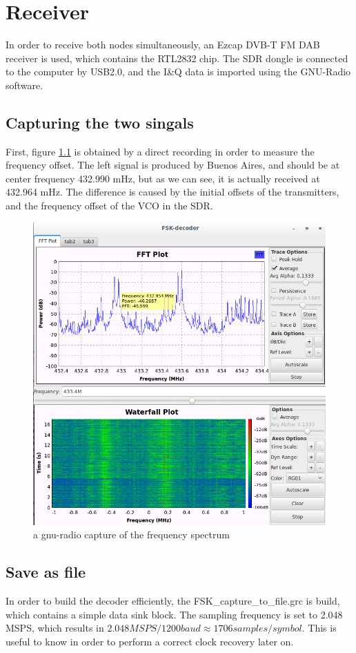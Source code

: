\chapter{Receiver}

In order to receive both nodes simultaneously, an Ezcap DVB-T FM DAB receiver is used, which contains the RTL2832 chip. The SDR dongle is connected to the computer by USB2.0, and the I\&Q data is imported using the GNU-Radio software. 

\section{Capturing the two singals}
First, figure \ref{fig:gnuradio_waterfall} is obtained by a direct recording in order to measure the frequency offset. 
The left signal is produced by Buenos Aires, and should be at center frequency 432.990 mHz, but as we can see, it is actually received at 432.964 mHz. The difference is caused by the initial offsets of the transmitters, and the frequency offset of the VCO in the SDR. 

\begin{figure}[h]
\centering
\includegraphics[width=0.7\linewidth]{figures/gnuradio_waterfall_catpure}
\caption{a gnu-radio capture of the frequency spectrum}
\label{fig:gnuradio_waterfall}
\end{figure}

\section{Save as file} 
In order to build the decoder efficiently, the FSK\_capture\_to\_file.grc is build, which contains a simple data sink block. The sampling frequency is set to 2.048 MSPS, which results in $2.048MSPS / 1200 baud \approx 1706 samples/symbol$. This is useful to know in order to perform a correct clock recovery later on.


